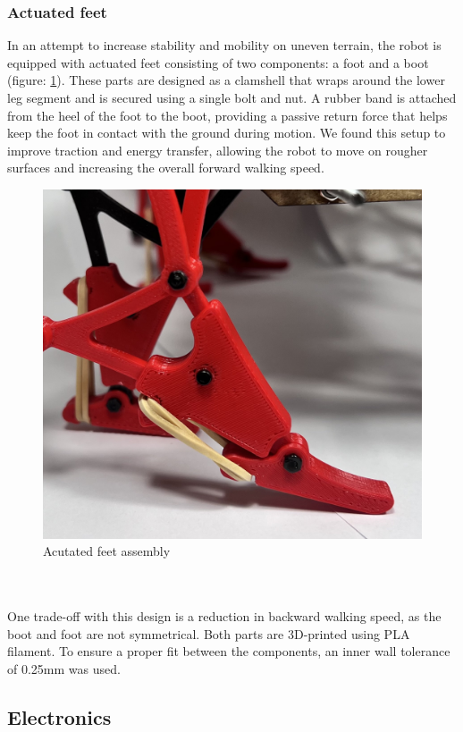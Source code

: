 \subsubsection{Actuated feet}
In an attempt to increase stability and mobility on uneven terrain, the robot is equipped with actuated feet consisting of two components: a foot and a boot (figure: \ref{fig:feet}). These parts are designed as a clamshell that wraps around the lower leg segment and is secured using a single bolt and nut. A rubber band is attached from the heel of the foot to the boot, providing a passive return force that helps keep the foot in contact with the ground during motion. We found this setup to improve traction and energy transfer, allowing the robot to move on rougher surfaces and increasing the overall forward walking speed.
\begin{figure} [!htb]
    \centering
    \includegraphics[width=1\linewidth]{images/Feet_assembly.jpeg}
    \caption{Acutated feet assembly}
    \label{fig:feet}
\end{figure}
\\ \\
One trade-off with this design is a reduction in backward walking speed, as the boot and foot are not symmetrical. Both parts are 3D-printed using PLA filament. To ensure a proper fit between the components, an inner wall tolerance of 0.25mm was used.
\subsection{Electronics}

